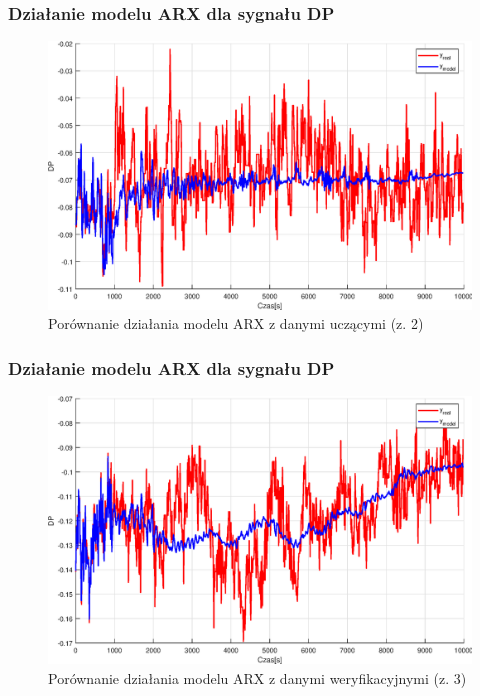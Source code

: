 \addtocounter{framenumber}{-1}
\begin{frame}
  \frametitle{Działanie modelu ARX dla sygnału DP}
  \begin{figure}[H]
    \centering
    \includegraphics[width=0.75\linewidth,keepaspectratio]{results_matlab/DP_2.eps}
    \caption{Porównanie działania modelu ARX z danymi uczącymi (z. 2)}
    \label{fig:test}
    \end{figure}
\end{frame}

\addtocounter{framenumber}{-1}
\begin{frame}
  \frametitle{Działanie modelu ARX dla sygnału DP}
  \begin{figure}[H]
    \centering
    \includegraphics[width=0.75\linewidth,keepaspectratio]{results_matlab/DP_3.eps}
    \caption{Porównanie działania modelu ARX z danymi weryfikacyjnymi (z. 3)}
    \label{fig:test}
    \end{figure}
\end{frame}


